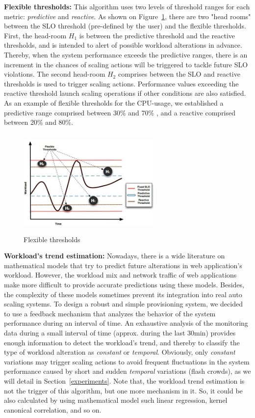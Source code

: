 \textbf{Flexible thresholds:} This algorithm uses two levels of threshold ranges for each metric: \emph{predictive} and \emph{reactive}. As shown on Figure~\ref{flexibleThresholds}, there are two "head rooms" between the SLO threshold (pre-defined by the user) and the flexible thresholds.  First, the head-room $H_1$ is between the predictive threshold and the reactive thresholds, and is intended to alert of possible workload alterations in advance.  Thereby, when the system performance exceeds the predictive ranges, there is an increment in the chances of scaling actions will be triggered to tackle future SLO violations. The second head-room $H_2$ comprises between the SLO and reactive thresholds is used to trigger scaling actions. Performance values exceeding the reactive threshold launch scaling operations if other conditions are also satisfied. As an example of flexible thresholds for the CPU-usage, we established a predictive range comprised between 30\% and 70\% , and a reactive comprised between 20\% and 80\%.  

\begin{figure}
\begin{center}
\includegraphics[width=7cm, height=5.3cm]{./images/thresholdGraphic.jpg}
\end{center}
\caption{Flexible thresholds}
\label{flexibleThresholds}
\end{figure}

\textbf{Workload's trend estimation:} Nowadays, there is a wide literature on mathematical models that try to predict future alterations in web application's workload. However, the workload mix and network traffic of web applications make more difficult to provide accurate predictions using these models. Besides, the complexity of these models sometimes prevent its integration into real auto scaling systems. To design a robust and simple provisioning system, we decided to use a feedback mechanism that analyzes the behavior of the system performance during an interval of time. An exhaustive analysis of the monitoring data during a small interval of time (approx. during the last 30min) provides enough information to detect the workload's trend, and thereby to classify the type of workload alteration as \emph{constant} or \emph{temporal}. Obviously, only \emph{constant} variations may trigger scaling actions to avoid frequent fluctuations in the system performance caused by short and sudden \emph{temporal} variations (flash crowds), as we will detail in Section~\ref{experiments}. Note that, the workload trend estimation is not the trigger of this algorithm, but one more mechanism in it. So, it could be also calculated by using mathematical model such linear regression, kernel canonical correlation, and so on.

